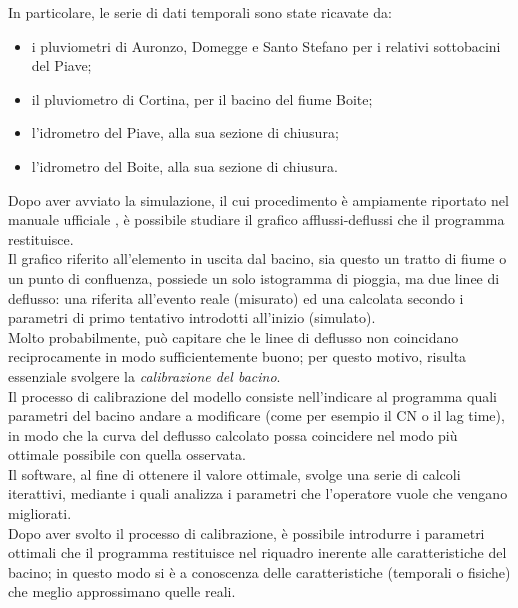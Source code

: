 In particolare, le serie di dati temporali sono state ricavate da:
\begin{itemize}
    \item i pluviometri di Auronzo, Domegge e Santo Stefano per i relativi sottobacini del Piave;
    \item il pluviometro di Cortina, per il bacino del fiume Boite;
    \item l'idrometro del Piave, alla sua sezione di chiusura;
    \item l'idrometro del Boite, alla sua sezione di chiusura.
\end{itemize}
Dopo aver avviato la simulazione, il cui procedimento è ampiamente riportato nel manuale ufficiale \cite{manual_hec_hms}, è possibile studiare il grafico afflussi-deflussi che il programma restituisce.\\
Il grafico riferito all'elemento in uscita dal bacino, sia questo un tratto di fiume o un punto di confluenza, possiede un solo istogramma di pioggia, ma due linee di deflusso: una riferita all'evento reale (misurato) ed una calcolata secondo i parametri di primo tentativo introdotti all'inizio (simulato).\\
Molto probabilmente, può capitare che le linee di deflusso non coincidano reciprocamente in modo sufficientemente buono; per questo motivo, risulta essenziale svolgere la \textit{calibrazione del bacino}.\\
Il processo di calibrazione del modello consiste nell'indicare al programma quali parametri del bacino andare a modificare (come per esempio il CN o il lag time), in modo che la curva del deflusso calcolato possa coincidere nel modo più ottimale possibile con quella osservata.\\
Il software, al fine di ottenere il valore ottimale, svolge una serie di calcoli iterattivi, mediante i quali analizza i parametri che l'operatore vuole che vengano migliorati.\\
Dopo aver svolto il processo di calibrazione, è possibile introdurre i parametri ottimali che il programma restituisce nel riquadro inerente alle caratteristiche del bacino; in questo modo si è a conoscenza delle caratteristiche (temporali o fisiche) che meglio approssimano quelle reali.
